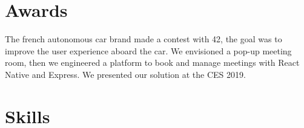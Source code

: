 \documentclass[a4paper]{deedy-resume} %
\begin{document}


\section{Awards}

\insectionspace
\insectionspace

\sectionspace
\sectionspace %


\begin{description}[leftmargin=0pt]
\item The french autonomous car brand made a contest with 42, the goal was to improve the user experience aboard the car. We envisioned a pop-up meeting room, then we engineered a platform to book and manage meetings with React Native and Express. We presented our solution at the CES 2019.
\end{description}
\sectionspace %



\section{Skills}
\end{document}

